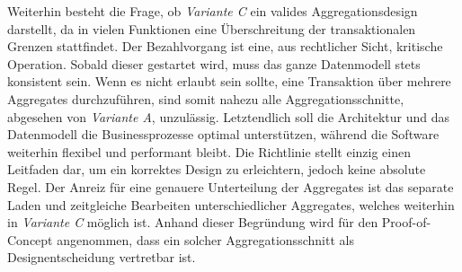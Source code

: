 Weiterhin besteht die Frage, ob \emph{Variante C} ein valides Aggregationsdesign darstellt, da in vielen Funktionen eine Überschreitung der transaktionalen Grenzen stattfindet. Der Bezahlvorgang ist eine, aus rechtlicher Sicht, kritische Operation. Sobald dieser gestartet wird, muss das ganze Datenmodell stets konsistent sein. Wenn es nicht erlaubt sein sollte, eine Transaktion über mehrere Aggregates durchzuführen, sind somit nahezu alle Aggregationsschnitte, abgesehen von \emph{Variante A}, unzulässig. Letztendlich soll die Architektur und das Datenmodell die Businessprozesse optimal unterstützen, während die Software weiterhin flexibel und performant bleibt. Die Richtlinie stellt einzig einen Leitfaden dar, um ein korrektes Design zu erleichtern, jedoch keine absolute Regel. Der Anreiz für eine genauere Unterteilung der Aggregates ist das separate Laden und zeitgleiche Bearbeiten unterschiedlicher Aggregates, welches weiterhin in \emph{Variante C} möglich ist. Anhand dieser Begründung wird für den Proof-of-Concept angenommen, dass ein solcher Aggregationsschnitt als Designentscheidung vertretbar ist. 

